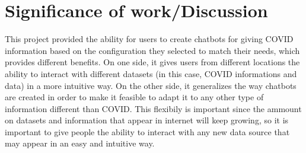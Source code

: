 \documentclass[]{article}
\begin{document}
\section*{Significance of work/Discussion}
This project provided the ability for users to create chatbots for giving COVID information based on the configuration they selected to match their needs, which provides different benefits. On one side, it gives users from different locations the ability to interact with different datasets (in this case, COVID informations and data) in a more intuitive way. On the other side, it generalizes the way chatbots are created in order to make it feasible to adapt it to any other type of information different than COVID. This flexibily is important since the ammount on datasets and information that appear in internet will keep growing, so it is important to give people the ability to interact with any new data source that may appear in an easy and intuitive way.



\end{document}
